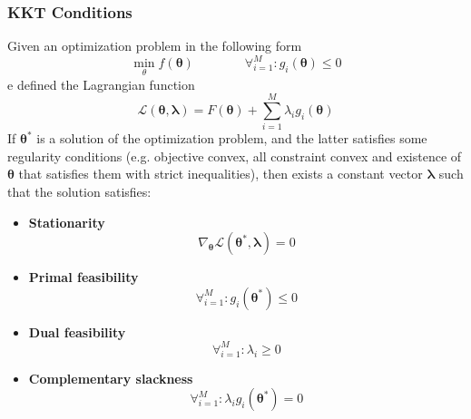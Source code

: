 \subsubsection{KKT Conditions}
\begin{definition}
	Given an optimization problem in the following form
	\begin{equation*}
		\min_\theta f(\mathbf{\theta}) \qquad\qquad \forall_{i=1}^M : g_i(\mathbf{\theta}) \leq 0
	\end{equation*}
	e defined the Lagrangian function
	\begin{equation*}
		\mathcal{L}(\mathbf{\theta}, \mathbf{\lambda}) = F(\mathbf{\theta}) + \sum_{i=1}^{M} \lambda_i g_i(\mathbf{\theta})
	\end{equation*}
	If $\mathbf{\theta}^*$ is a solution of the optimization problem, and the latter satisfies some regularity conditions (e.g. objective convex, all constraint convex and existence of $\mathbf{\theta}$ that satisfies them with strict inequalities), then exists a constant vector $\mathbf{\lambda}$ such that the solution satisfies:
	\begin{itemize}
		\item \textbf{Stationarity}
		\begin{equation}
			\nabla_\mathbf{\theta} \mathcal{L}(\mathbf{\theta^*}, \mathbf{\lambda}) = 0
		\end{equation}
		\item \textbf{Primal feasibility}
		\begin{equation}
			\forall_{i=1}^M : g_i(\mathbf{\theta^*}) \leq 0
		\end{equation}
		\item \textbf{Dual feasibility}
		\begin{equation}
			\forall_{i=1}^M:\lambda_i \geq 0
		\end{equation}
		\item \textbf{Complementary slackness}
		\begin{equation}
			\forall_{i=1}^M: \lambda_i g_i(\mathbf{\theta^*}) = 0
		\end{equation}
	\end{itemize}
\end{definition}

